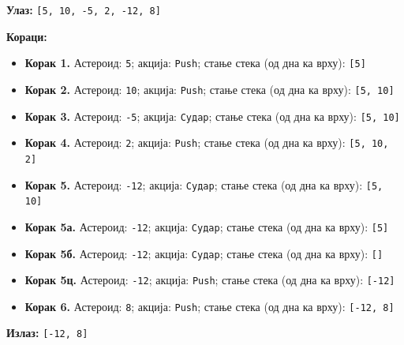 \textbf{Улаз:} \texttt{[5, 10, -5, 2, -12, 8]}

\textbf{Кораци:}
\begin{itemize}
	\item \textbf{Корак 1.} Астероид: \texttt{5}; акција: \texttt{Push}; стање стека (од дна ка врху): \texttt{[5]}
	\item \textbf{Корак 2.} Астероид: \texttt{10}; акција: \texttt{Push}; стање стека (од дна ка врху): \texttt{[5, 10]}
	\item \textbf{Корак 3.} Астероид: \texttt{-5}; акција: \texttt{Судар}; стање стека (од дна ка врху): \texttt{[5, 10]}
	\item \textbf{Корак 4.} Астероид: \texttt{2}; акција: \texttt{Push}; стање стека (од дна ка врху): \texttt{[5, 10, 2]}
	\item \textbf{Корак 5.} Астероид: \texttt{-12}; акција: \texttt{Судар}; стање стека (од дна ка врху): \texttt{[5, 10]}
	\item \textbf{Корак 5а.} Астероид: \texttt{-12}; акција: \texttt{Судар}; стање стека (од дна ка врху): \texttt{[5]}
	\item \textbf{Корак 5б.} Астероид: \texttt{-12}; акција: \texttt{Судар}; стање стека (од дна ка врху): \texttt{[]}
	\item \textbf{Корак 5ц.} Астероид: \texttt{-12}; акција: \texttt{Push}; стање стека (од дна ка врху): \texttt{[-12]}
	\item \textbf{Корак 6.} Астероид: \texttt{8}; акција: \texttt{Push}; стање стека (од дна ка врху): \texttt{[-12, 8]}
\end{itemize}

\textbf{Излаз:} \texttt{[-12, 8]}

